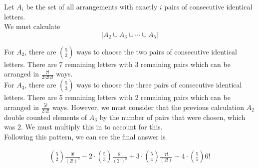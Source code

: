 \documentclass{report}
\begin{document}
{{    Let $A_i$ be the set of all arrangements with exactly $i$ pairs of consecutive
    identical letters. \\

    We must calculate $$|A_2 \cup A_3 \cup \cdots \cup A_5|$$

    For $A_2$, there are $\binom{5}{2}$ ways to choose the two pairs of consecutive
    identical letters. There are 7 remaining letters with 3 remaining pairs
    which can be arranged in $\frac{7!}{2!2!2!}$ ways. \\

    For $A_3$, there are $\binom{5}{3}$ ways to choose the three pairs of consecutive
    identical letters. There are 5 remaining letters with 2 remaining pairs
    which can be arranged in $\frac{5!}{2!2!}$ ways. However,
    we must consider that the previous calculation $A_2$ double counted
    elements of $A_3$ by the number of pairs that were chosen, which was
    $2$. We must multiply this in to account for this.  \\

    Following this pattern, we can see the final answer is

    \begin{align*}
        \binom{5}{2}\frac{9!}{(2!)^3} - 2\cdot \binom{5}{3}\frac{8!}{(2!)^2} + 3\cdot \binom{5}{4}\frac{7!}{(2!)} - 4\cdot \binom{5}{5}6!
    \end{align*}

}


}
\end{document}
